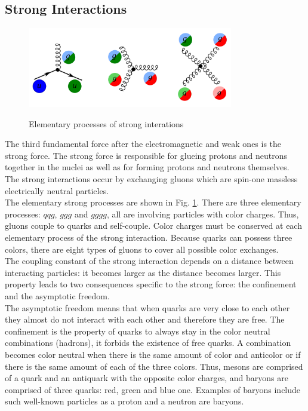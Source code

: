 \subsection{Strong Interactions}
\label{sec:Intro_QCD}

\begin{figure}[htb]
  \begin{center}
    {\includegraphics[width=0.80\textwidth]{../figs/Intro/feynmStrong.png}}
    \caption{Elementary processes of strong interations}
    \label{fig:feynmStrong}
  \end{center}
\end{figure}


The third fundamental force after the electromagnetic and weak ones is the strong force. The strong force is responsible for glueing protons and neutrons together in the nuclei as well as for forming protons and neutrons themselves. The strong interactions occur by exchanging gluons which are spin-one massless electrically neutral particles.  \\

The elementary strong processes are shown in Fig. \ref{fig:feynmStrong}. There are three elementary processes: $qqg$, $ggg$ and $gggg$, all are involving particles with color charges. Thus, gluons couple to quarks and self-couple. Color charges must be conserved at each elementary process of the strong interaction. Because quarks can possess three colors, there are eight types of gluons to cover all possible color exchanges. \\

The coupling constant of the strong interaction depends on a distance between interacting particles: it becomes larger as the distance becomes larger. This property leads to two consequences specific to the strong force: the confinement and the asymptotic freedom.\\

The asymptotic freedom means that when quarks are very close to each other they almost do not interact with each other and therefore they are free. The confinement is the property of quarks to always stay in the color neutral combinations (hadrons), it forbids the existence of free quarks. A combination becomes color neutral when there is the same amount of color and anticolor or if there is the same amount of each of the three colors.  Thus, mesons are comprised of a quark and an antiquark with the opposite color charges, and baryons are comprised of three quarks: red, green and blue one. Examples of baryons include such well-known particles as a proton and a neutron are baryons.\\

